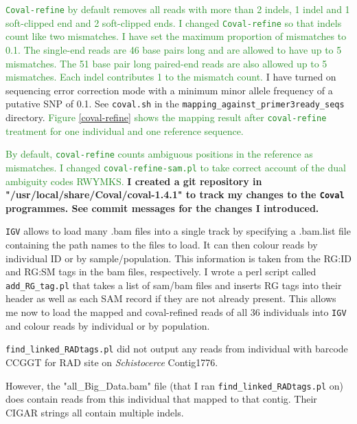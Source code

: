 \documentclass{article}\usepackage[]{graphicx}\usepackage[]{color}
\newcommand{\roger}[1]{ \textcolor[named]{ForestGreen}{#1} }
\begin{document}
\roger{\texttt{Coval-refine} by default removes all reads with more than 2 indels, 1 indel and 1 soft-clipped end and 2 soft-clipped ends. I changed \texttt{Coval-refine} so that indels count like two mismatches. I have set the maximum proportion of mismatches to 0.1. The single-end reads are 46 base pairs long and are allowed to have up to 5 mismatches. The 51 base pair long paired-end reads are also allowed up to 5 mismatches. Each indel contributes 1 to the mismatch count.} 
I have turned on sequencing error correction mode with a minimum minor allele  frequency of a putative SNP of 0.1. See \texttt{coval.sh} in the \texttt{mapping\_against\_primer3ready\_seqs} directory. 
\roger{Figure \ref{coval-refine} shows the mapping result after \texttt{coval-refine} treatment for one individual and one reference sequence.}

\roger{By default, \texttt{coval-refine} counts ambiguous positions in the reference as mismatches. I changed \texttt{coval-refine-sam.pl} to take correct account of the dual ambiguity codes RWYMKS.} \textbf{I created a git repository in "/usr/local/share/Coval/coval-1.4.1" to track my changes to the \texttt{Coval} programmes. See commit messages for the changes I introduced.}

\texttt{IGV} allows to load many .bam files into a single track by specifying a .bam.list file containing the path names to the files to load. It can then colour reads by individual ID or by sample/population. This information is taken from the RG:ID and RG:SM tags in the bam files, respectively. I wrote a perl script called \texttt{add\_RG\_tag.pl} that takes a list of sam/bam files and inserts RG tags into their header as well as each SAM record if they are not already present. This allows me now to load the mapped and coval-refined reads of all 36 individuals into \texttt{IGV} and colour reads by individual or by population.

\hypertarget{CCGGT}{
\texttt{find\_linked\_RADtags.pl} did not output any reads from individual with barcode CCGGT for RAD site on \textit{Schistocerce} Contig1776. 
}
However, the "all\_Big\_Data.bam" file (that I ran \texttt{find\_linked\_RADtags.pl} on) does contain reads from this individual that mapped to that contig. Their CIGAR strings all contain multiple indels. 
\end{document}
